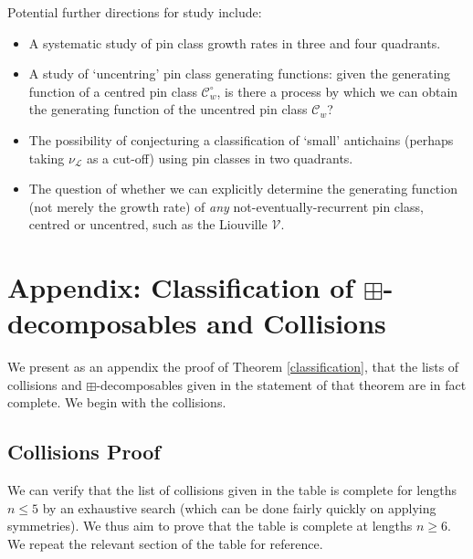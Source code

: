 \documentclass[11pt,a4paper]{article}
\theoremstyle{definition}
\begin{document}
Potential further directions for study include:
\begin{itemize}
\item A systematic study of pin class growth rates in three and four quadrants.
\item A study of `uncentring' pin class generating functions: given the generating function of a centred pin class $\mathcal{C}^{\circ}_{w}$, is there a process by which we can obtain the generating function of the uncentred pin class $\mathcal{C}_{w}$?
\item The possibility of conjecturing a classification of `small' antichains (perhaps taking $\nu_{\mathcal{L}}$ as a cut-off) using pin classes in two quadrants.
\item The question of whether we can explicitly determine the generating function (not merely the growth rate) of \emph{any} not-eventually-recurrent pin class, centred or uncentred, such as the Liouville $\mathcal{V}$.
\end{itemize}

\appendix
\section{Appendix: Classification of $\boxplus$-decomposables and Collisions}
\renewcommand{\thesubsection}{(\Alph{subsection})}

We present as an appendix the proof of Theorem \ref{classification}, that the lists of collisions and $\boxplus$-decomposables given in the statement of that theorem are in fact complete. We begin with the collisions.

\subsection{Collisions Proof}

We can verify that the list of collisions given in the table is complete for lengths $n \leq 5$ by an exhaustive search (which can be done fairly quickly on applying symmetries). We thus aim to prove that the table is complete at lengths $n \geq 6$. We repeat the relevant section of the table for reference.
\end{document}
